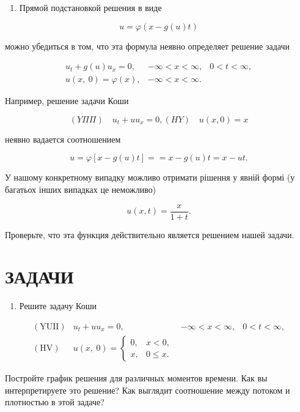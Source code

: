 \documentclass[
  ukrainian,
]{article}
\providecommand{\tightlist}{%
  \setlength{\itemsep}{0pt}\setlength{\parskip}{0pt}}
\begin{document}
\begin{enumerate}
\def\labelenumi{\arabic{enumi}.}
\setcounter{enumi}{1}
\tightlist
\item
  Прямой подстановкой решения в виде
\end{enumerate}

\[
u = \varphi(x - g(u) t)
\]

можно убедиться в том, что эта формула неявно определяет решение задачи

\[
\begin{array}{lll} u_t + g\left(u\right) u_x = 0, & -\infty < x < \infty, & 0 < t < \infty, \\ u\left(x, \ 0\right) = \varphi\left(x\right), & -\infty < x < \infty. \end{array}
\]

Например, решение задачи Коши

\[
(Y\Pi\Pi) \quad u_t + uu_x = 0,
(HY) \quad u(x, 0) = x
\]

неявно вадается соотношением

\[
u = \varphi [x - g(u) t] =
= x - g(u) t = x - ut.
\]

У нашому конкретному випадку можливо отримати рішення у явній формі (у
багатьох інших випадках це неможливо)

\[
u(x, t) = \frac{x}{1+t}.
\]

Проверьте, что эта функция действительно является решением нашей задачи.

\section{\texorpdfstring{\textbf{ЗАДАЧИ}}{ЗАДАЧИ}}\label{ux437ux430ux434ux430ux447ux438}

\begin{enumerate}
\def\labelenumi{\arabic{enumi}.}
\tightlist
\item
  Решите задачу Коши
\end{enumerate}

\[
\begin{array}{lll} (\text{YUII}) & u_t + uu_x = 0, & -\infty < x < \infty, & 0 < t < \infty, \\ (\text{HV}) & u(x, \ 0) = \begin{cases} 0, & x < 0, \\ x, & 0 \leqslant x. \end{cases} \end{array}
\]

Постройте график решения для различных моментов времени. Как вы
интерпретируете это решение? Как выглядит соотношение между потоком и
плотностью в этой задаче?
\end{document}
